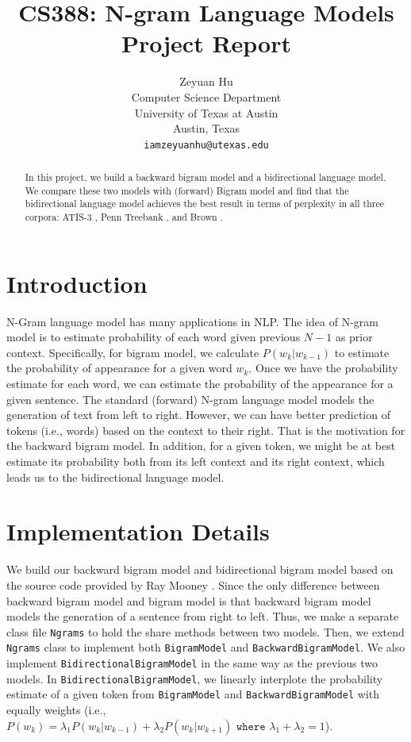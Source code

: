\documentclass[11pt,a4paper]{article}
\title{CS388: N-gram Language Models Project Report}
\author{Zeyuan Hu \\
  Computer Science Department \\
  University of Texas at Austin \\
  Austin, Texas \\
  {\tt iamzeyuanhu@utexas.edu} \\
}
\date{}
\begin{document}
\maketitle

\begin{abstract}
In this project, we build a backward bigram model and a bidirectional language model.
We compare these two models with (forward) Bigram model and find that the bidirectional
language model achieves the best result in terms of perplexity in all three corpora:
ATIS-3 \cite{Dahl94}, Penn Treebank \cite{Marcus:1994}, and Brown \cite{browncorpus}.
\end{abstract}

\section{Introduction}

N-Gram language model has many applications in NLP. The idea of N-gram model
is to estimate probability of each word given previous $N-1$ as prior context.
Specifically, for bigram model, we calculate $P(w_k|w_{k-1})$ to estimate the 
probability of appearance for a given word $w_k$. Once we have the probability
estimate for each word, we can estimate the probability of the appearance for 
a given sentence. The standard (forward) N-gram language model models the generation
of text from left to right. However, we can have better prediction of tokens (i.e., words)
based on the context to their right. That is the motivation for the backward bigram 
model. In addition, for a given token, we might be at best estimate its probability
both from its left context and its right context, which leads us to the bidirectional
language model.

\section{Implementation Details}

We build our backward bigram model and bidirectional bigram model based on the 
source code provided by Ray Mooney \cite{ray}. Since the only difference between
backward bigram model and bigram model is that backward bigram model models the 
generation of a sentence from right to left. Thus, we make a separate class file
\texttt{Ngrams} to hold the share methods between two models. Then, we extend
\texttt{Ngrams} class to implement both \texttt{BigramModel} and \texttt{BackwardBigramModel}.
We also implement \texttt{BidirectionalBigramModel} in the same way as the previous two models.
In \texttt{BidirectionalBigramModel}, we linearly interplote the probability estimate
of a given token from \texttt{BigramModel} and \texttt{BackwardBigramModel} with equally weights
(i.e., $P(w_k) = \lambda_1 P(w_k|w_{k-1}) + \lambda_2 P(w_k | w_{k+1}) \texttt{ where } \lambda_1 + \lambda_2 = 1$).
\end{document}
